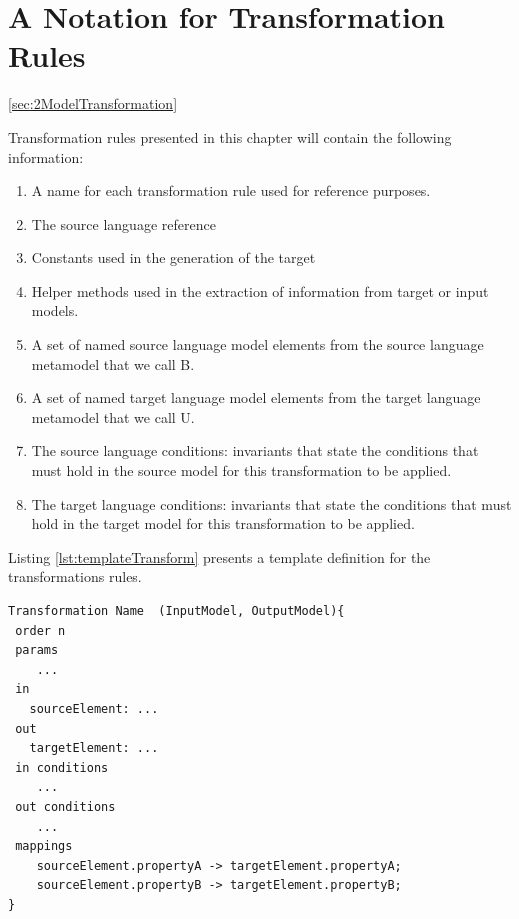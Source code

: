 \section{A Notation for Transformation Rules}
\ref{sec:2ModelTransformation}

Transformation rules presented in this chapter will contain the following information:

\begin{enumerate}

\item A name for each transformation rule used for reference purposes.

\item The source language reference

\item Constants used in the generation of the target

\item Helper methods used in the extraction of information from target or input models.

\item A set of named source language model elements from the source language metamodel that we call B.

\item A set of named target language model elements from the target language metamodel that we call U.

\item The source language conditions: invariants that state the conditions that must hold in the source model for this transformation to be applied.

\item The target language conditions: invariants that state the conditions that must hold in the target model for this transformation to be applied.

\end{enumerate}


Listing \ref{lst:templateTransform} presents a template definition for the transformations rules.

\begin{lstlisting}[style=mine,caption=Template definition for Transformation rules,label=lst:templateTransform]
Transformation Name  (InputModel, OutputModel){
 order n
 params
 	...
 in
   sourceElement: ...
 out
   targetElement: ...
 in conditions
    ...
 out conditions
 	...
 mappings
    sourceElement.propertyA -> targetElement.propertyA;
    sourceElement.propertyB -> targetElement.propertyB;
}
\end{lstlisting}

